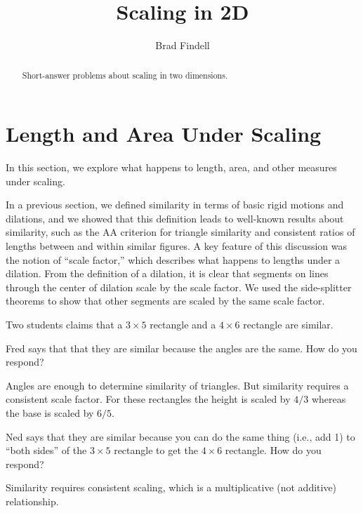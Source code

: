 \documentclass[nooutcomes]{ximera}
\title{Scaling in 2D}
\author{Brad Findell}
\begin{document}
\begin{abstract}
Short-answer problems about scaling in two dimensions. 
\end{abstract}
\maketitle




\section{Length and Area Under Scaling}
In this section, we explore what happens to length, area, and other measures under scaling.  
 
In a previous section, we defined similarity in terms of basic rigid motions and dilations, and we showed that this definition leads to well-known results about similarity, such as the AA criterion for triangle similarity and consistent ratios of lengths between and within similar figures. A key feature of this discussion was the notion of ``scale factor,'' which describes what happens to lengths under a dilation.  From the definition of a dilation, it is clear that segments on lines through the center of dilation scale by the scale factor.  We used the side-splitter theorems to show that other segments are scaled by the same scale factor.  

\begin{question}
Two students claims that a $3\times 5$ rectangle and a $4\times 6$ rectangle are similar.  

Fred says that that they are similar because the angles are the same.  How do you respond?  
\begin{freeResponse}
\begin{hint}
Angles are enough to determine similarity of triangles.  But similarity requires a consistent scale factor.  For these rectangles the height is scaled by $4/3$ whereas the base is scaled by $6/5$.  
\end{hint}
\end{freeResponse}

Ned says that they are similar because you can do the same thing (i.e., add 1) to ``both sides'' of the $3\times 5$ rectangle to get the $4\times 6$ rectangle.  How do you respond?  
\begin{freeResponse}
\begin{hint}
Similarity requires consistent scaling, which is a multiplicative (not additive) relationship.  
\end{hint}
\end{freeResponse}
\end{question}
\end{document}
